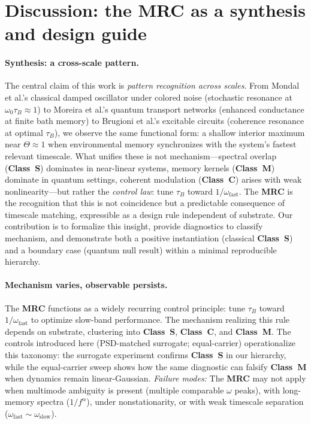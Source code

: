 \documentclass[11pt,letterpaper]{article}
\DeclareRobustCommand{\mrc}{\textbf{MRC}\xspace}
\DeclareRobustCommand{\classS}{\textbf{Class~S}\xspace}
\DeclareRobustCommand{\classC}{\textbf{Class~C}\xspace}
\DeclareRobustCommand{\classM}{\textbf{Class~M}\xspace}
\begin{document}
\clearpage
\section{Discussion: the \mrc as a synthesis and design guide}

\paragraph*{Synthesis: a cross-scale pattern.}
The central claim of this work is \emph{pattern recognition across scales}. From Mondal et al.'s classical damped oscillator under colored noise (stochastic resonance at $\omega_0\tau_B\!\approx\!1$) to Moreira et al.'s quantum transport networks (enhanced conductance at finite bath memory) to Brugioni et al.'s excitable circuits (coherence resonance at optimal $\tau_B$), we observe the same functional form: a shallow interior maximum near $\Theta\!\approx\!1$ when environmental memory synchronizes with the system's fastest relevant timescale. What unifies these is not mechanism---spectral overlap (\classS) dominates in near-linear systems, memory kernels (\classM) dominate in quantum settings, coherent modulation (\classC) arises with weak nonlinearity---but rather the \emph{control law}: tune $\tau_B$ toward $1/\omega_{\mathrm{fast}}$. The \mrc is the recognition that this is not coincidence but a predictable consequence of timescale matching, expressible as a design rule independent of substrate. Our contribution is to formalize this insight, provide diagnostics to classify mechanism, and demonstrate both a positive instantiation (classical \classS) and a boundary case (quantum null result) within a minimal reproducible hierarchy.

\paragraph*{Mechanism varies, observable persists.}
The \mrc functions as a widely recurring control principle: tune $\tau_B$ toward $1/\omega_{\mathrm{fast}}$ to optimize slow-band performance. The mechanism realizing this rule depends on substrate, clustering into \classS{}, \classC{}, and \classM{}. The controls introduced here (PSD-matched surrogate; equal-carrier) operationalize this taxonomy: the surrogate experiment confirms \classS{} in our hierarchy, while the equal-carrier sweep shows how the same diagnostic can falsify \classM{} when dynamics remain linear-Gaussian. \emph{Failure modes:} The \mrc may not apply when multimode ambiguity is present (multiple comparable $\omega$ peaks), with long-memory spectra ($1/f^\alpha$), under nonstationarity, or with weak timescale separation ($\omega_{\mathrm{fast}}\sim\omega_{\mathrm{slow}}$).
\end{document}
